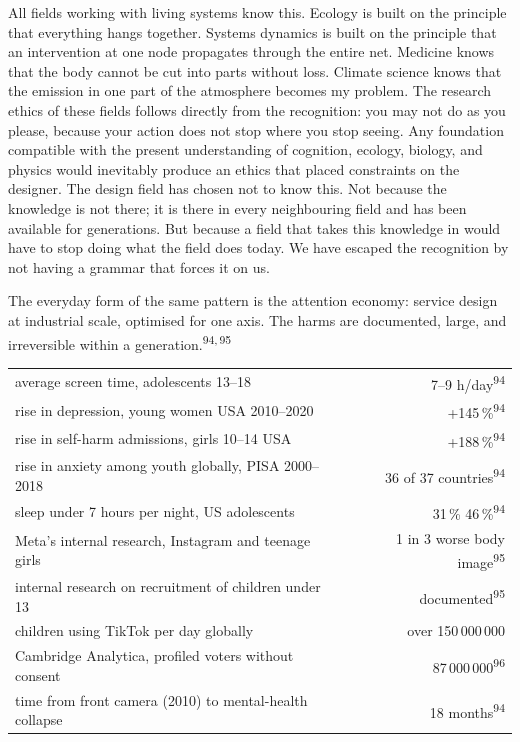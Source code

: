 \begin{widebody}
{All fields working with living systems know this. Ecology is built on the principle that everything hangs together. Systems dynamics is built on the principle that an intervention at one node propagates through the entire net. Medicine knows that the body cannot be cut into parts without loss. Climate science knows that the emission in one part of the atmosphere becomes my problem. The research ethics of these fields follows directly from the recognition: you may not do as you please, because your action does not stop where you stop seeing. Any foundation compatible with the present understanding of cognition, ecology, biology, and physics would inevitably produce an ethics that placed constraints on the designer. The design field has chosen not to know this. Not because the knowledge is not there; it is there in every neighbouring field and has been available for generations. But because a field that takes this knowledge in would have to stop doing what the field does today. We have escaped the recognition by not having a grammar that forces it on us.

The everyday form of the same pattern is the attention economy: service design at industrial scale, optimised for one axis. The harms are documented, large, and irreversible within a generation.\textsuperscript{94,\,95}

\begin{center}
\footnotesize
\renewcommand{\arraystretch}{1.15}
\begin{tabular}{@{}p{58mm}r@{}}
\toprule
average screen time, adolescents 13--18 & 7--9 h/day\textsuperscript{94} \\
rise in depression, young women USA 2010--2020 & +145\,\%\textsuperscript{94} \\
rise in self-harm admissions, girls 10--14 USA & +188\,\%\textsuperscript{94} \\
rise in anxiety among youth globally, PISA 2000--2018 & 36 of 37 countries\textsuperscript{94} \\
sleep under 7 hours per night, US adolescents & 31\,\%\,\msym{→}\,46\,\%\textsuperscript{94} \\
Meta's internal research, Instagram and teenage girls & 1 in 3 worse body image\textsuperscript{95} \\
internal research on recruitment of children under 13 & documented\textsuperscript{95} \\
children using TikTok per day globally & over 150\,000\,000 \\
Cambridge Analytica, profiled voters without consent & 87\,000\,000\textsuperscript{96} \\
time from front camera (2010) to mental-health collapse & 18 months\textsuperscript{94} \\
\bottomrule
\end{tabular}
\end{center}

}
\end{widebody}
